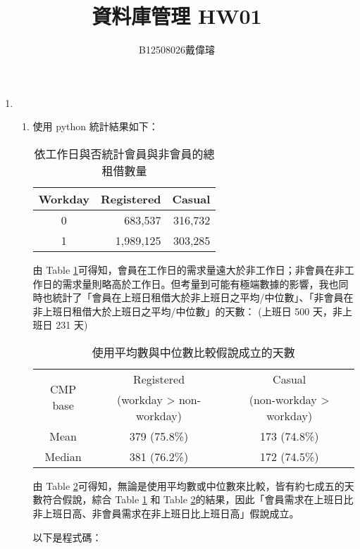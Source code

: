 \documentclass[12pt,a4paper]{article}
\title{資料庫管理 HW01}
\author{B12508026戴偉璿}
\date{}
\begin{document}
\maketitle


\begin{enumerate}
    \item
    \begin{enumerate}
        \item 使用 python 統計結果如下：
        \begin{table}[H]
        \centering
        \begin{tabular}{c rr}
        \toprule
        Workday & Registered & Casual \\
        \midrule
        0 & 683,537  & 316,732 \\
        1 & 1,989,125 & 303,285 \\
        \bottomrule
        \end{tabular}
        \caption{依工作日與否統計會員與非會員的總租借數量}
        \label{tab:workday_total}
        \end{table}
        由 Table \ref{tab:workday_total}可得知，會員在工作日的需求量遠大於非工作日；非會員在非工作日的需求量則略高於工作日。但考量到可能有極端數據的影響，我也同時也統計了「會員在上班日租借大於非上班日之平均/中位數」、「非會員在非上班日租借大於上班日之平均/中位數」的天數： (上班日 500 天，非上班日 231 天)
        \begin{table}[H]
        \centering
        \begin{tabular}{c cc}
        \toprule
        \multirow{2}{*}{CMP base} & Registered & Casual \\
        & (workday > non-workday) & (non-workday > workday) \\
        \midrule
        Mean   & 379 (75.8\%) & 173 (74.8\%) \\
        Median & 381 (76.2\%) & 172 (74.5\%) \\
        \bottomrule
        \end{tabular}
        \caption{使用平均數與中位數比較假說成立的天數}
        \label{tab:cmp_days}
        \end{table}
        由 Table \ref{tab:cmp_days}可得知，無論是使用平均數或中位數來比較，皆有約七成五的天數符合假說，綜合 Table \ref{tab:workday_total} 和 Table \ref{tab:cmp_days}的結果，因此「會員需求在上班日比非上班日高、非會員需求在非上班日比上班日高」假說成立。

        以下是程式碼：


\end{enumerate}
\end{enumerate}
\end{document}
